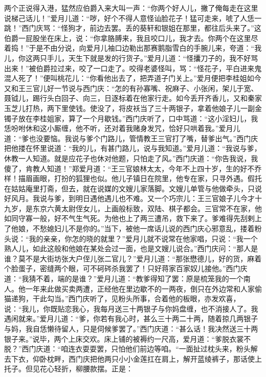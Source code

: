 两个正说得入港，猛然应伯爵入来大叫一声：“你两个好人儿，撇了俺每走在这里说梯己话儿！”爱月儿道：“哕，好个不得人意怪讪脸花子！猛可走来，唬了人恁一跳！”西门庆骂：“怪狗才，前边去罢。丢的葵轩和银姐在那里，都往后头来了。”这伯爵一屁股坐在床上，说：“你拿胳膊来，我且咬口儿，我才去。你两个在这里尽着捣！”于是不由分说，向爱月儿袖口边勒出那赛鹅脂雪白的手腕儿来，夸道：“我儿，你这两只手儿，天生下就是发的行货子。”爱月儿道：“怪攮刀子的，我不好骂出来！”被伯爵拉过来，咬了一口走了。咬得老婆怪叫，骂：“怪花子，平白进来鬼混人死了！”便叫桃花儿：“你看他出去了，把弄道子门关上。”爱月便把李桂姐如今又和王三官儿好一节说与西门庆：“怎的有孙寡嘴、祝麻子、小张闲，架儿于宽、聂钺儿，踢行头白回子、向三，日逐标着在他家行走。如今丢开齐香儿，又和秦家玉芝儿打热，两下里使钱。使没了，将皮袄当了三十两银子，拿着他娘子儿一副金镯子放在李桂姐家，算了一个月歇钱。”西门庆听了，口中骂道：“这小淫妇儿，我恁吩咐休和这小厮缠，他不听，还对着我赌身发咒，恰好只哄着我。”爱月儿道：“爹也没要恼。我说与爹个门路儿，管情教王三官打了嘴，替爹出气。”西门庆把他搂在怀里说道：“我的儿，有甚门路儿，说与我知道。”爱月儿道：“我说与爹，休教一人知道。就是应花子也休对他题，只怕走了风。”西门庆道：“你告我说，我傻了，肯教人知道！”郑爱月道：“王三官娘林太太，今年不上四十岁，生的好不乔样！描眉画眼，打扮的狐狸也似。他儿子镇日在院里，他专在家，只寻外遇。假托在姑姑庵里打斋，但去，就在说媒的文嫂儿家落脚。文嫂儿单管与他做牵头，只说好风月。我说与爹，到明日遇他遇儿也不难。又一个巧宗儿：王三官娘子儿今才十九岁，是东京六黄太尉侄女儿，上画般标致，双陆、棋子都会。三官常不在家，他如同守寡一般，好不气生气死。为他也上了两三遭吊，救下来了。爹难得先刮剌上了他娘，不愁媳妇儿不是你的。”当下，被他一席话儿说的西门庆心邪意乱，搂着粉头说：“我的亲亲，你怎的晓的就里？”爱月儿就不说常在他家唱，只说：“我一个熟人儿，如此这般和他娘在某处会过一面，也是文嫂儿说合。”西门庆问：“那人是谁？莫不是大街坊张大户侄儿张二官儿？”爱月儿道：“那张懋德儿，好的货，麻着个脸蛋子，密缝两个眼，可不砢硶杀我罢了！只好蒋家百家奴儿接他。”西门庆道：“我猜不着，端的是谁？”爱月儿道：“教爹得知了罢：原是梳笼我的一个南人。他一年来此做买卖两遭，正经他在里边歇不的一两夜，倒只在外边常和人家偷猫递狗，干此勾当。”西门庆听了，见粉头所事，合着他的板眼，亦发欢喜，说：“我儿，你既贴恋我心，我每月送三十两银子与你妈盘缠，也不消接人了。我遇闲就来。”爱月儿道：“爹，你若有我心时，甚么三十两二十两，随着掠几两银子与妈，我自恁懒待留人，只是伺候爹罢了。”西门庆道：“甚么话！我决然送三十两银子来。”说毕，两个上床交欢。床上铺的被褥约一尺高，爱月道：“爹脱衣裳不脱？”西门庆道：“咱连衣耍耍罢，只怕他们前边等咱。“一面扯过枕头来，粉头解去下衣，仰卧枕畔，西门庆把他两只小小金莲扛在肩上，解开蓝绫裤子，那话使上托子。但见花心轻折，柳腰款摆。正是：

